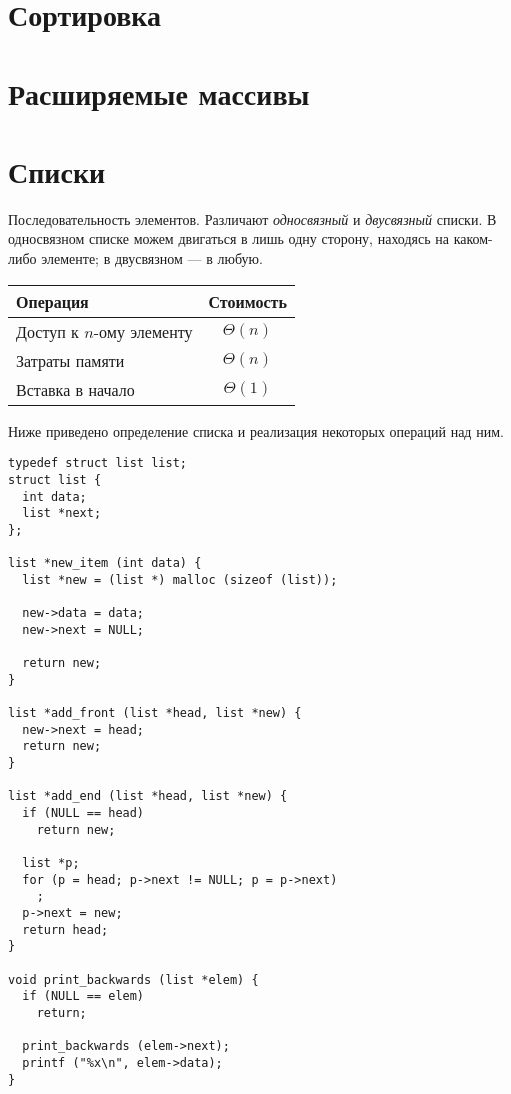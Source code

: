 \section{Сортировка}
\label{sec:sorting}

\section{Расширяемые массивы}
\label{sec:ext-arrays}

\section{Списки}
\label{sec:lists}

Последовательность элементов. Различают \emph{односвязный} и \emph{двусвязный} списки. В односвязном списке можем двигаться в лишь одну сторону, находясь на каком-либо элементе; в двусвязном --- в любую.
\begin{center}
  \begin{tabular}{lc}
    \toprule
    Операция & Стоимость \\
    \midrule
    Доступ к $n$-ому элементу & $\Theta(n)$ \\
    Затраты памяти & $\Theta(n)$ \\
    Вставка в начало & $\Theta(1)$ \\
    \bottomrule
  \end{tabular}
\end{center}

Ниже приведено определение списка и реализация некоторых операций над ним.

\lstset{label=lst:list-impl,caption=Некоторые операции}
\begin{lstlisting}
typedef struct list list;
struct list {
  int data;
  list *next;
};

list *new_item (int data) {
  list *new = (list *) malloc (sizeof (list));

  new->data = data;
  new->next = NULL;

  return new;
}

list *add_front (list *head, list *new) {
  new->next = head;
  return new;
}

list *add_end (list *head, list *new) {
  if (NULL == head)
    return new;

  list *p;
  for (p = head; p->next != NULL; p = p->next)
    ;
  p->next = new;
  return head;
}

void print_backwards (list *elem) {
  if (NULL == elem)
    return;

  print_backwards (elem->next);
  printf ("%x\n", elem->data);
}
\end{lstlisting}

